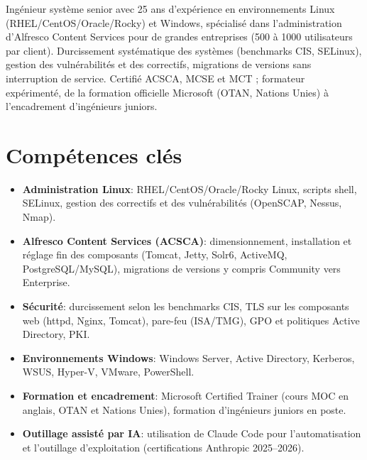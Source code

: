 \documentclass[11pt,a4paper,sans]{moderncv}
\begin{document}
\makecvtitle


\vspace{6pt}
\small{Ingénieur système senior avec 25 ans d'expérience en environnements Linux (RHEL/CentOS/Oracle/Rocky) et Windows, spécialisé dans l'administration d'Alfresco Content Services pour de grandes entreprises (500 à 1000 utilisateurs par client). Durcissement systématique des systèmes (benchmarks CIS, SELinux), gestion des vulnérabilités et des correctifs, migrations de versions sans interruption de service. Certifié ACSCA, MCSE et MCT ; formateur expérimenté, de la formation officielle Microsoft (OTAN, Nations Unies) à l'encadrement d'ingénieurs juniors.}


\section{Compétences clés}
\vspace{1pt}
\begin{itemize}

\item \textbf{Administration Linux}: RHEL/CentOS/Oracle/Rocky Linux, scripts shell, SELinux, gestion des correctifs et des vulnérabilités (OpenSCAP, Nessus, Nmap).

\item \textbf{Alfresco Content Services (ACSCA)}: dimensionnement, installation et réglage fin des composants (Tomcat, Jetty, Solr6, ActiveMQ, PostgreSQL/MySQL), migrations de versions y compris Community vers Enterprise.

\item \textbf{Sécurité}: durcissement selon les benchmarks CIS, TLS sur les composants web (httpd, Nginx, Tomcat), pare-feu (ISA/TMG), GPO et politiques Active Directory, PKI.

\item \textbf{Environnements Windows}: Windows Server, Active Directory, Kerberos, WSUS, Hyper-V, VMware, PowerShell.

\item \textbf{Formation et encadrement}: Microsoft Certified Trainer (cours MOC en anglais, OTAN et Nations Unies), formation d'ingénieurs juniors en poste.

\item \textbf{Outillage assisté par IA}: utilisation de Claude Code pour l'automatisation et l'outillage d'exploitation (certifications Anthropic 2025--2026).

\end{itemize}
\end{document}
